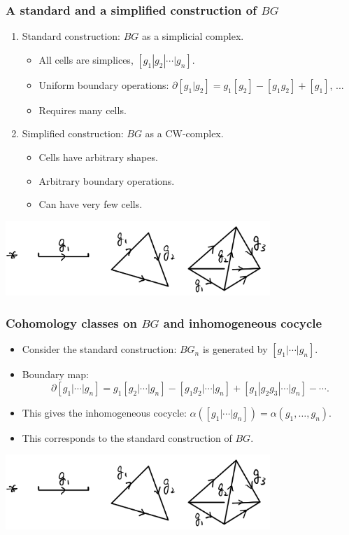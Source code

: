 \documentclass[xcolor=table, aspectratio=169,ignorenonframetext]{beamer}
\begin{document}
\begin{frame}
	\frametitle{A standard and a simplified construction of $BG$}
	\begin{enumerate}
		\item Standard construction: $BG$ as a simplicial complex.
		\begin{itemize}
			\item All cells are simplices, $[g_1|g_2|\cdots|g_n]$.
			\item Uniform boundary operations:
			$\partial[g_1|g_2]=g_1[g_2]-[g_1g_2]+[g_1]$, ...
			\item Requires many cells.
		\end{itemize}
		\item Simplified construction: $BG$ as a CW-complex.
		\begin{itemize}
			\item Cells have arbitrary shapes.
			\item Arbitrary boundary operations.
			\item Can have very few cells.
		\end{itemize}
	\end{enumerate}
	\begin{center}
		\includegraphics[width=10cm]{../chainmap/bg-std}
	\end{center}
\end{frame}


\begin{frame}
	\frametitle{Cohomology classes on $BG$ and inhomogeneous cocycle}
	\begin{itemize}
		\item Consider the standard construction:
		$BG_n$ is generated by $[g_1|\cdots|g_n]$.
		\item Boundary map:
		\[\partial[g_1|\cdots|g_n]=g_1[g_2|\cdots|g_n]
		-[g_1g_2|\cdots|g_n]+[g_1|g_2g_3|\cdots|g_n]-\cdots.\]
		\item This gives the inhomogeneous cocycle:
		$\alpha([g_1|\cdots|g_n])=\alpha(g_1,\ldots,g_n)$.
		\item This corresponds to the standard construction of $BG$.
	\end{itemize}
\begin{center}
	\includegraphics[width=10cm]{../chainmap/bg-std}
\end{center}
\end{frame}
\end{document}
